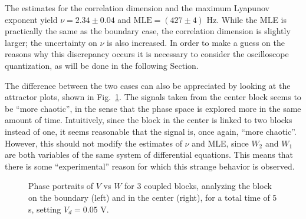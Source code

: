 The estimates for the correlation dimension and the maximum Lyapunov exponent yield
$\nu=2.34\pm0.04$ and $\text{MLE}=(427\pm4)$ Hz.
While the MLE is practically the same as the boundary case, the correlation dimension is slightly
larger; the uncertainty on $\nu$ is also increased.
In order to make a guess on the reasons why
this discrepancy occurs it is necessary to consider the oscilloscope quantization,
as will be done in the following Section.

The difference between the two cases can also be appreciated by looking at the attractor plots,
shown in Fig.~\ref{fig: 3 blocks attractors}. The signals taken from the center block seems to be
``more chaotic'', in the sense that the phase space is explored more in the same amount of time.
Intuitively, since the block in the center is linked to two blocks instead of one, it seems reasonable
that the signal is, once again, ``more chaotic''.
However, this should not modify the estimates of $\nu$ and MLE, since $W_2$ and $W_1$ are both
variables of the same system of differential equations. This means that there is some
``experimental'' reason for which this strange behavior is observed.

\begin{figure}[!htbp]
    \centering
    \caption{Phase portraits of $V$ vs $W$ for 3 coupled blocks, analyzing the block on the boundary
    (left) and in the center (right), for a total time of 5 s, setting $V_d=0.05$ V.
    }\label{fig: 3 blocks attractors}  
\end{figure}


